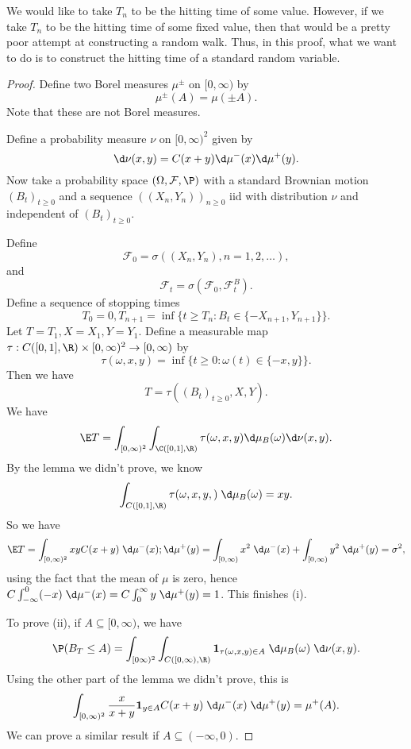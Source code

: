 \documentclass[a4paper]{article}
\begin{document}
We would like to take $T_n$ to be the hitting time of some value. However, if we take $T_n$ to be the hitting time of some fixed value, then that would be a pretty poor attempt at constructing a random walk. Thus, in this proof, what we want to do is to construct the hitting time of a standard random variable.

\begin{proof}
  Define two Borel measures $\mu^{\pm}$ on $[0, \infty)$ by
  \[
    \mu^{\pm}(A) = \mu(\pm A).
  \]
  Note that these are not Borel measures.

  Define a probability measure $\nu$ on $[0, \infty)^2$ given by
  \[
    \d \nu(x, y) = C(x + y) \d \mu^-(x) \d \mu^+(y).
  \]
  Now take a probability space $(\Omega, \mathcal{F}, \P)$ with a standard Brownian motion $(B_t)_{t \geq 0}$ and a sequence $((X_n, Y_n))_{n \geq 0}$ iid with distribution $\nu$ and independent of $(B_t)_{t \geq 0}$.

  Define
  \[
    \mathcal{F}_0 = \sigma((X_n, Y_n), n = 1, 2, \ldots),
  \]
  and
  \[
    \mathcal{F}_t = \sigma(\mathcal{F}_0, \mathcal{F}_t^B).
  \]
  Define a sequence of stopping times
  \[
    T_0 = 0, T_{n + 1} = \inf\{t \geq T_n: B_t \in \{-X_{n + 1}, Y_{n + 1}\}\}.
  \]
  Let $T = T_1, X = X_1,Y = Y_1$. Define a measurable map $\tau: C([0, 1], \R) \times [0, \infty)^2 \to [0, \infty)$ by
  \[
    \tau(\omega, x, y) = \inf \{t \geq 0: \omega(t) \in \{-x, y\}\}.
  \]
  Then we have
  \[
    T = \tau((B_t)_{t \geq 0}, X, Y).
  \]
  We have
  \[
    \E T = \int_{[0, \infty)^2} \int_{\C([0, 1], \R)} \tau(\omega, x, y) \d \mu_B(\omega) \d \nu(x, y).
  \]
  By the lemma we didn't prove, we know
  \[
    \int_{C([0, 1], \R)} \tau(\omega, x, y, ) \;\d \mu_B(\omega) = xy.
  \]
  So we have
  \[
    \E T = \int_{[0, \infty)^2} xy C(x + y) \;\d \mu^- (x);\d \mu^+(y) = \int_{[0, \infty)} x^2 \;\d \mu^-(x) + \int_{[0, \infty)} y^2 \;\d \mu^+(y) = \sigma^2,
  \]
  using the fact that the mean of $\mu$ is zero, hence $C \int_{-\infty}^0 (-x) \;\d \mu^-(x) = C \int_0^\infty y \;\d \mu^+(y) = 1$. This finishes (i).

  To prove (ii), if $A \subseteq [0, \infty)$, we have
  \[
    \P(B_T \leq A) = \int_{[0\infty)^2} \int_{C([0, \infty), \R)} \mathbf{1}_{\tau(\omega, x, y) \in A} \;\d \mu_B(\omega) \;\d \nu(x, y).
  \]
  Using the other part of the lemma we didn't prove, this is
  \[
    \int_{[0, \infty)^2} \frac{x}{x + y} \mathbf{1}_{y \in A} C(x + y) \;\d \mu^-(x) \;\d \mu^+(y) = \mu^+(A).
  \]
  We can prove a similar result if $A \subseteq (-\infty, 0)$.
\end{proof}
\end{document}

